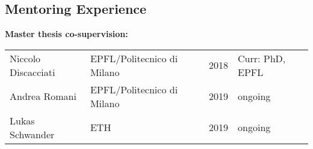 \documentclass[margin]{res}
\begin{document}
\begin{resume}
\section{Mentoring Experience} 
               
                  \textbf{Master thesis co-supervision:}
                      \begin{table}[!h]
                       \begin{tabular}{llll}
                       Niccolo Discacciati & EPFL/Politecnico di Milano & 2018 & Curr: PhD, EPFL \\
                       Andrea Romani       & EPFL/Politecnico di Milano & 2019 & ongoing                \\
                       Lukas Schwander    & ETH                                         &  2019 & ongoing               
                        \end{tabular}
                        \end{table}
                                     


\end{resume}
\end{document}
